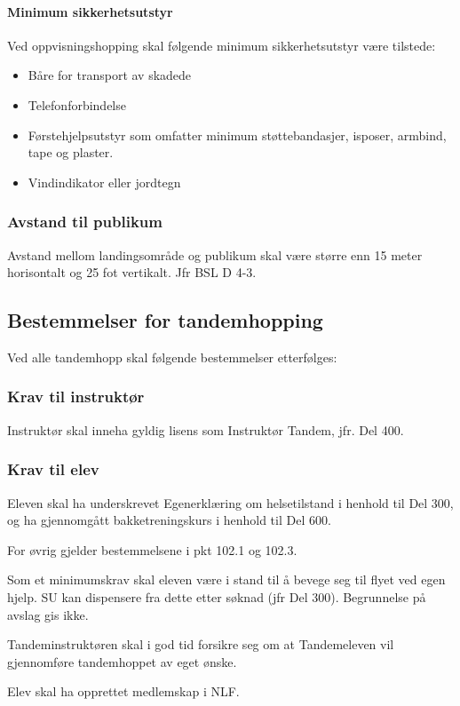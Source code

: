 \paragraph{Minimum sikkerhetsutstyr}
Ved oppvisningshopping skal følgende minimum sikkerhetsutstyr være tilstede:
\begin{itemize}
	\item Båre for transport av skadede
	\item Telefonforbindelse
	\item Førstehjelpsutstyr som omfatter minimum støttebandasjer, isposer, armbind, tape og plaster.
	\item Vindindikator eller jordtegn
\end{itemize}

\subsubsection{Avstand til publikum}
Avstand mellom landingsområde og publikum skal være større enn 15 meter horisontalt og 25 fot vertikalt. Jfr BSL D 4-3.

\subsection{Bestemmelser for tandemhopping}
Ved alle tandemhopp skal følgende bestemmelser etterfølges:

\subsubsection{Krav til instruktør}
Instruktør skal inneha gyldig lisens som Instruktør Tandem, jfr. Del 400.

\subsubsection{Krav til elev}
Eleven skal ha underskrevet Egenerklæring om helsetilstand i henhold til Del 300, og ha gjennomgått bakketreningskurs i henhold til Del 600.

For øvrig gjelder bestemmelsene i pkt 102.1 og 102.3.

Som et minimumskrav skal eleven være i stand til å bevege seg til flyet ved egen hjelp. SU kan dispensere fra dette etter søknad (jfr Del 300). Begrunnelse på avslag gis ikke.

Tandeminstruktøren skal i god tid forsikre seg om at Tandemeleven vil gjennomføre tandemhoppet av eget ønske.

Elev skal ha opprettet medlemskap i NLF.

